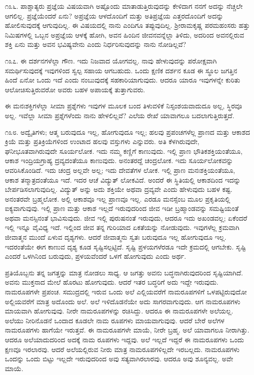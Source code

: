೧೩೬. ಪಾಶ್ಚಾತ್ಯರು ಪ್ರಜ್ಞೆಯ ವಿಷಯವಾಗಿ ಅಷ್ಟೊಂದು ಮಾತಾಡುತ್ತಿರುವುದನ್ನು ಕೇಳಿದಾಗ ನನಗೆ ಅದನ್ನು ನೆಚ್ಚಲೇ ಆಗಲಿಲ್ಲ. ಪ್ರಜ್ಞೆಯೆಂದರೆ ಏನು? ಅಪ್ರಜ್ಞೆಯ ಆಳದೊಂದಿಗೆ ಮತ್ತು ಅತಿಪ್ರಜ್ಞೆಯ ಎತ್ತರದೊಂದಿಗೆ ಅದನ್ನು ಹೋಲಿಸುವುದಕ್ಕೆ ಆಗುವುದಿಲ್ಲ. ಈ ವಿಷಯದಲ್ಲಿ ನಾನು ಎಂದಿಗೂ ತಪ್ಪುವುದಿಲ್ಲ. ಶ‍್ರೀರಾಮಕೃಷ್ಣ ಪರಮಹಂಸರು ಹತ್ತು ನಿಮಿಷಗಳಲ್ಲಿ ಒಬ್ಬನ ಅಪ್ರಜ್ಞೆಯ ಆಳಕ್ಕೆ ಹೋಗಿ, ಅವನ ಹಿಂದಿನ ಜೀವನವನ್ನೆಲ್ಲಾ ತಿಳಿದು, ಅದರಿಂದ ಅವನಲ್ಲಿರುವ ಶಕ್ತಿ ಏನು ಮತ್ತು ಅವನ ಭವಿಷ್ಯವೇನು ಎಂದು ನಿರ್ಧರಿಸುವುದನ್ನು ನಾನು ನೋಡಿಲ್ಲವೆ?

೧೩೭. ಈ ದರ್ಶನಗಳೆಲ್ಲಾ ಗೌಣ. ಇದು ನಿಜವಾದ ಯೋಗವಲ್ಲ. ನಾವು ಹೇಳುವುದನ್ನು ಪರೋಕ್ಷವಾಗಿ ಸಮರ್ಥಿಸುವುದಕ್ಕೆ ಇವುಗಳಿಂದ ಸ್ವಲ್ಪ ಸಹಾಯ ಆಗಬಹುದು. ಒಂದು ಕ್ಷಣಿಕ ದರ್ಶನ ಕೂಡ ಈ ಸ್ಥೂಲ ಜಗತ್ತಿನ ಹಿಂದೆ ಏನೋ ಒಂದು ಇದೆ ಎಂದು ನಂಬುವುದಕ್ಕೆ ಸಹಕಾರಿಯಾಗುವುದು. ಆದರೂ ಯಾರೂ ಇವುಗಳನ್ನೇ ಕುರಿತು ಆಲೋಚಿಸುತ್ತಿರುವರೋ ಅವರು ಬಹಳ ಅಪಾಯಕ್ಕೆ ತುತ್ತಾಗುವರು.

ಈ ಮನಃಶಕ್ತಿಗಳೆಲ್ಲಾ ಸೀಮಾ ಪ್ರಶ್ನೆಗಳು  ಇವುಗಳ ಮೂಲಕ ಬಂದ ತಿಳುವಳಿಕೆ ನಿಸ್ಸಂಶಯವಾದುದೂ ಅಲ್ಲ, ಸ್ಥಿರವೂ ಅಲ್ಲ. ಇವೆಲ್ಲಾ ಸೀಮಾ ಪ್ರಶ್ನೆಗಳೆಂದು ನಾನು ಹೇಳಲಿಲ್ಲವೆ? ಎಲೆಯ ರೇಖೆ ಯಾವಾಗಲೂ ಬದಲಾಗುತ್ತಿರುತ್ತದೆ.

೧೩೮. ಅದ್ವೈತಿಗಳು; ಆತ್ಮ ಬರುವುದೂ ಇಲ್ಲ, ಹೋಗುವುದೂ ಇಲ್ಲ; ಹಲವು ಪ್ರಪಂಚಗಳೆಲ್ಲ ಪ್ರಾಣದ ಮತ್ತು ಆಕಾಶದ ಕ್ರಿಯೆ ಮತ್ತು ಪ್ರತಿಕ್ರಿಯೆಗಳಿಂದ ಉಂಟಾದ ಹಲವು ವಸ್ತುಗಳು ಎನ್ನುವರು. ಅತಿ ಕೆಳಗಿರುವುದೇ, ಘನೀಭೂತವಾಗಿರುವುದೇ ಸೂರ್ಯಲೋಕ. ಇದು ನಮ್ಮ ಕಣ್ಣಿಗೆ ಕಾಣುವುದು. ಇಲ್ಲಿ ಪ್ರಾಣ ಭೌತಿಕಶಕ್ತಿಯಂತೆಯೂ, ಆಕಾಶ ಇಂದ್ರಿಯಗ್ರಾಹ್ಯ ದ್ರವ್ಯದಂತೆಯೂ ಕಾಣುವುದು. ಅನಂತರದ್ದೆ ಚಂದ್ರಲೋಕ. ಇದು ಸೂರ್ಯಲೋಕವನ್ನು ಆವರಿಸಿಕೊಂಡಿದೆ. ಇದು ಚಂದ್ರ ಅಲ್ಲವೇ ಅಲ್ಲ; ಇದು ದೇವತೆಗಳ ಲೋಕ. ಇಲ್ಲಿ ಪ್ರಾಣ ಮನಃಶಕ್ತಿಯಂತೆಯೂ, ಆಕಾಶ ತನ್ಮಾತ್ರದಂತೆಯೂ ಇದೆ. ಇದರ ಆಚೆ ವಿದ್ಯುತ್‌ ಲೋಕವಿದೆ. ಅಂದರೆ ಈ ಸ್ಥಿತಿಯಲ್ಲಿ ಆಕಾಶದಿಂದ ಇದನ್ನು ಬೇರ್ಪಡಿಸಲಾಗುವುದಿಲ್ಲ. ವಿದ್ಯುತ್ ಅನ್ನು ಅದು ಶಕ್ತಿಯೇ ಅಥವಾ ದ್ರವ್ಯವೇ ಎಂದು ಹೇಳುವುದು ಬಹಳ ಕಷ್ಟ. ಅನಂತರವೇ ಬ್ರಹ್ಮಲೋಕ. ಅಲ್ಲಿ ಆಕಾಶವೂ ಇಲ್ಲ ಪ್ರಾಣವೂ ಇಲ್ಲ. ಎರಡೂ ಮನಸ್ಸೆಂಬ ಮೂಲ ಪ್ರಕೃತಿಯಲ್ಲಿ ಐಕ್ಯವಾಗುವುವು. ಇಲ್ಲಿ ಪ್ರಾಣ ಮತ್ತು ಆಕಾಶ ಇಲ್ಲದೆ ಇರುವುದರಿಂದ ಜೀವ ಇಡೀ ಬ್ರಹ್ಮಾಂಡವನ್ನು ಸಮಷ್ಟಿಯಂತೆ ಅಥವಾ ಮನಸ್ಸಿನಂತೆ ಭಾವಿಸುವುದು. ಜೀವ ಇಲ್ಲಿ ಪುರುಷನಂತೆ ಇರುವುದು, ಆದರೂ ಇದು ಅಖಂಡವಲ್ಲ; ಏಕೆಂದರೆ ಇಲ್ಲಿ ಇನ್ನೂ ವೈವಿಧ್ಯ ಇದೆ. ಇಲ್ಲಿಂದ ಜೀವ ತನ್ನ ಗುರಿಯಾದ ಏಕತೆಯನ್ನು ನೋಡುವುದು. ಇವುಗಳೆಲ್ಲ ಕ್ರಮವಾಗಿ ಜೀವಾತ್ಮನ ಮುಂದೆ ಏಳುವ ದೃಶ್ಯಗಳು. ಆದರೆ ಜೀವಾತ್ಮನು ಸ್ವತಃ ಬರುವುದೂ ಇಲ್ಲ ಹೋಗುವುದೂ ಇಲ್ಲ. ಇದರಂತೆಯೇ ಈಗ ಕಾಣುವ ದೃಶ್ಯ ಕೂಡ ಸೃಷ್ಟಿಸಲ್ಪಟ್ಟಿದೆ. ಸೃಷ್ಟಿ ಪ್ರಳಯಗಳೆರಡೂ ಇದೇ ಕ್ರಮದಲ್ಲಿ ಆಗಬೇಕು. ಸೃಷ್ಟಿ ಎಂದರೆ ಒಳಗಿನಿಂದ ಬರುವುದು, ಪ್ರಳಯವೆಂದರೆ ಒಳಗೆ ಹೋಗುವುದು ಎಂದು ಅರ್ಥ.

ಪ್ರತಿಯೊಬ್ಬನು ತನ್ನ ಜಗತ್ತನ್ನು ಮಾತ್ರ ನೋಡಲು ಸಾಧ್ಯ. ಆ ಜಗತ್ತು ಅವನು ಬದ್ಧನಾಗಿರುವುದರಿಂದ ಸೃಷ್ಟಿಯಾಗಿದೆ. ಅವನು ಮುಕ್ತನಾದ ಮೇಲೆ ಹೊರಟು ಹೋಗುವುದು. ಆದರೆ ಇತರ ಬದ್ಧರಿಗೆ ಅದು ಇದ್ದೇ ಇರುವುದು. ನಾಮರೂಪಗಳೇ ಪ್ರಪಂಚ. ಸಮುದ್ರದಲ್ಲಿ ಇರುವ ಒಂದು ಅಲೆ ಎಲ್ಲಿಯವರೆಗೆ ನಾಮರೂಪಗಳಿಗೆ ಒಳಪಟ್ಟಿರುವುದೋ ಅಲ್ಲಿಯವರೆಗೆ ಮಾತ್ರ ಅದೊಂದು ಅಲೆ. ಅಲೆ ಇಳಿದೊಡನೆಯೇ ಅದು ಸಾಗರವಾಗುವುದು. ಆಗ ನಾಮರೂಪಗಳು ಮಾಯವಾಗಿ ಹೋಗುವುವು. ನೀರೇ ನಾಮರೂಪಗಳನ್ನು ರಚಿಸಿದ್ದು. ಆದರೂ ಈ ನಾಮರೂಪಗಳೇ ಅಲೆಯಲ್ಲ. ಅಲೆಯು ನೀರಿನೊಡನೆ ಒಂದಾದ ಕೂಡಲೇ ನಾಮ ರೂಪಗಳು ಮಾಯವಾಗುವುವು. ಆದರೆ ಬೇರೆ ಅಲೆಗಳ ನಾಮರೂಪಗಳು ಹಾಗೆಯೇ ಇರುತ್ತವೆ. ಈ ನಾಮರೂಪಗಳೇ ಮಾಯೆ, ನೀರೇ ಬ್ರಹ್ಮ. ಅಲೆ ಯಾವಾಗಲೂ ನೀರಾಗಿತ್ತು. ಆದರೂ ಅಲೆಯಾದುದರಿಂದ ಅದಕ್ಕೆ ನಾಮ ರೂಪಗಳು ಇದ್ದವು. ಅಲೆ ಇಲ್ಲದೆ ಇದ್ದರೆ ಈ ನಾಮರೂಪಗಳು ಒಂದು ಕ್ಷಣವೂ ಇರಲಾರವು. ಆದರೆ ಅಲೆಯಲ್ಲಿರುವ ನೀರು ಮಾತ್ರ ನಾಮರೂಪಗಳಿಲ್ಲದೇ ಇರಬಲ್ಲದು. ನಾಮರೂಪಗಳು ಒಂದನ್ನು ಒಂದು ಬಿಟ್ಟು ಇಲ್ಲದೇ ಇರುವುದರಿಂದ ಅವು ಸತ್ಯವಾಗಿರಲಾರವು. ಆದರೂ ಅವು ಶೂನ್ಯವಲ್ಲ. ಅವೇ ಮಾಯೆ.

